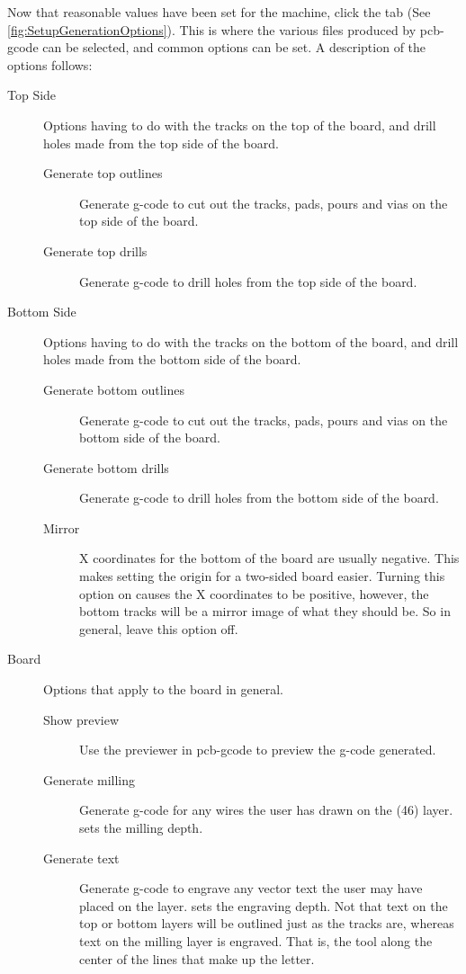 \documentclass[11pt]{book}
\begin{document}
Now that reasonable values have been set for the machine, click the  tab (See \figurename \vref{fig:SetupGenerationOptions}). This is where the various files produced by pcb-gcode can be selected, and common options can be set. A description of the options follows:

\begin{description}
	\item[Top Side] Options having to do with the tracks on the top of the board, and drill holes made from the top side of the board.
	\begin{description}
		\item[Generate top outlines] Generate g-code to cut out the tracks, pads, pours and vias on the top side of the board.
		\item[Generate top drills] Generate g-code to drill holes from the top side of the board.
	\end{description}
	\item[Bottom Side] Options having to do with the tracks on the bottom of the board, and drill holes made from the bottom side of the board.
	\begin{description}
		\item[Generate bottom outlines] Generate g-code to cut out the tracks, pads, pours and vias on the bottom side of the board.
		\item[Generate bottom drills] Generate g-code to drill holes from the bottom side of the board.
		\item[Mirror] X coordinates for the bottom of the board are usually negative. This makes setting the origin for a two-sided board easier. Turning this option on causes the X coordinates to be positive, however, the bottom tracks will be a mirror image of what they should be. So in general, leave this option off.
	\end{description}
	\item[Board] Options that apply to the board in general.
	\begin{description}
		\item[Show preview] Use the previewer in pcb-gcode to preview the g-code generated.
		\item[Generate milling] Generate g-code for any wires the user has drawn on the  (46) layer.  sets the milling depth.
		\item[Generate text] Generate g-code to engrave any vector text the user may have placed on the  layer.  sets the engraving depth. Not that text on the top or bottom layers will be outlined just as the tracks are, whereas text on the milling layer is engraved. That is, the tool along the center of the lines that make up the letter.

\end{description}
\end{description}
\end{document}
